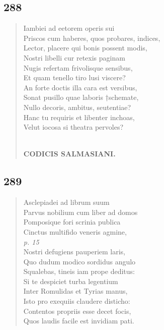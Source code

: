 \documentclass[11pt, a4paper]{report}
\begin{document}
            \subsection*{288}
      \begin{verse}
      Iambiei ad eetorem operis sui \\ Priscos cum haberes, quos probares, indices, \\ Lector, placere qui bonis possent modis, \\ Nostri libelli cur retexis paginam \\ Nugis refertam frivolisque sensibus, \\ Et quam tenello tiro lusi viscere? \\ An forte doctis illa cara est versibus, \\ Sonat pusillo quae laboris †schemate, \\ Nullo decoris, ambitus, seutentiae? \\ Hanc tu requiris et libenter inchoas, \\ Velut iocosa si theatra pervoles? \\ 
        ﻿\pagebreak 
    \begin{center} \textbf{CODICIS SALMASIANI.} \end{center} \marginpar{[249]} 
      \end{verse}
  
            \subsection*{289}
      \begin{verse}
      Asclepiadei ad librum suum \\ Parvus nobilium cum liber ad domos \\ Pomposique fori scrinia publica \\ Cinctus multifido veneris agmine, \\ \textit{p. 15} \\ Nostri defugiens pauperiem laris, \\ Quo dudum modico sordidus angulo \\ Squalebas, tineis iam prope deditus: \\ Si te despiciet turba legentium \\ Inter Romulidas et Tyrias manus, \\ Isto pro exequiis claudere disticho: \\ Contentos propriis esse decet focis, \\ Quos laudis facile est invidiam pati. \\ 
      \end{verse}
  
\end{document}
